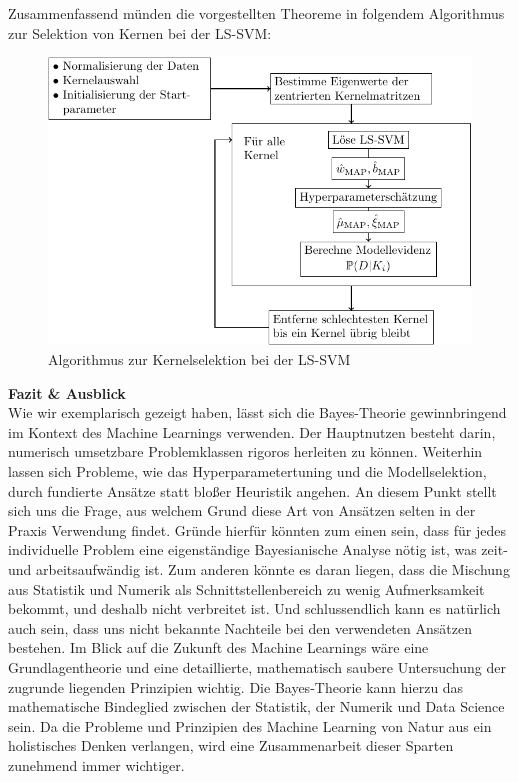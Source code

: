 Zusammenfassend münden die vorgestellten Theoreme in folgendem Algorithmus zur Selektion von Kernen bei der LS-SVM:

\begin{center}
	\begin{figure}
		\includegraphics[scale=0.9]{Algo.pdf}
		\caption{Algorithmus zur Kernelselektion bei der LS-SVM}
	\end{figure}
\end{center}

\newpage
\thispagestyle{plain}
\noindent\textbf{Fazit \& Ausblick}\\
Wie wir exemplarisch gezeigt haben, lässt sich die Bayes-Theorie gewinnbringend im Kontext des Machine Learnings verwenden. Der Hauptnutzen besteht darin, numerisch umsetzbare Problemklassen rigoros herleiten zu können. Weiterhin lassen sich Probleme, wie das Hyperparametertuning und die Modellselektion, durch fundierte Ansätze statt bloßer Heuristik angehen. An diesem Punkt stellt sich uns die Frage, aus welchem Grund diese Art von Ansätzen selten in der Praxis Verwendung findet. Gründe hierfür könnten zum einen sein, dass für jedes individuelle Problem eine eigenständige Bayesianische Analyse nötig ist, was zeit- und arbeitsaufwändig ist. Zum anderen könnte es daran liegen, dass die Mischung aus Statistik und Numerik als Schnittstellenbereich zu wenig Aufmerksamkeit bekommt, und deshalb nicht verbreitet ist. Und schlussendlich kann es natürlich auch sein, dass uns nicht bekannte Nachteile bei den verwendeten Ansätzen bestehen. Im Blick auf die Zukunft des Machine Learnings wäre eine Grundlagentheorie und eine detaillierte, mathematisch saubere Untersuchung der zugrunde liegenden Prinzipien wichtig. Die Bayes-Theorie kann hierzu das mathematische Bindeglied zwischen der Statistik, der Numerik und Data Science sein. Da die Probleme und Prinzipien des Machine Learning von Natur aus ein holistisches Denken verlangen, wird eine Zusammenarbeit dieser Sparten zunehmend immer wichtiger.